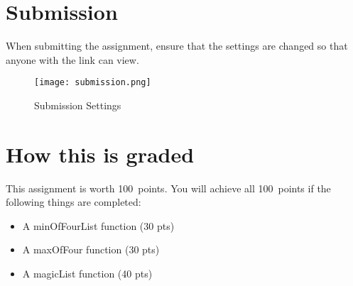 \documentclass{article}
\newcommand{\AValue}{100}
\begin{document}
\section*{Submission}
When submitting the assignment, ensure that the settings are changed so that anyone with the link can view.
\begin{figure}[H]
  \centering
  \texttt{[image: submission.png]}
  \caption{Submission Settings}
\end{figure}

\section*{How this is graded}
This assignment is worth \AValue \ points. You will achieve all \AValue \   points if the following things are completed:
\begin{itemize}
    \item A minOfFourList function (30 pts)
    \item A maxOfFour function (30 pts)
    \item A magicList function (40 pts)
\end{itemize}
\end{document}
